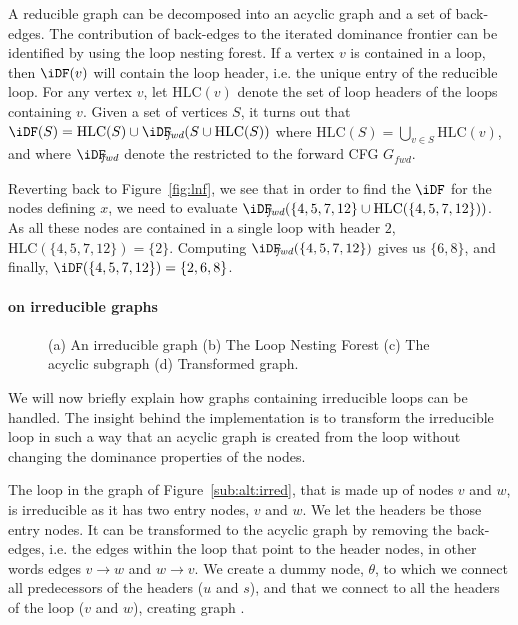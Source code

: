 {{\def\HLC{\mbox{HLC}} A reducible graph can be decomposed into an acyclic graph and a set of back-edges. 
  The contribution of back-edges to the iterated dominance frontier can be identified by using the loop nesting forest. 
  If a vertex $v$ is contained in a loop, then $\iDF(v)$ will contain the loop header, i.e. the unique entry of the reducible loop. 
  For any vertex $v$, let $\HLC(v)$ denote the set of loop headers of the loops containing $v$.
  Given a set of vertices $S$, it turns out that $\iDF(S) = \HLC(S) \cup \iDFfwd(S \cup \HLC(S))$ where $\HLC(S)=\bigcup_{v\in S} \HLC(v)$, and where $\iDFfwd$ denote the \iDF restricted to the forward CFG $G_{\textit{fwd}}$.

  Reverting back to Figure~\ref{fig:lnf}, we see that in order to find the $\iDF$ for the nodes defining $x$, we need to evaluate $\iDFfwd(\{4,5,7,12\} \cup \HLC(\{4,5,7,12\}))$. 
  As all these nodes are contained in a single loop with header $2$, $\HLC(\{4,5,7,12\}) = \{2\}$. 
  Computing $\iDFfwd(\{4,5,7,12\})$ gives us $\{6,8\}$, and finally, $\iDF(\{4,5,7,12\}) = \{2,6,8\}$. 
}

\paragraph{\iDF on irreducible graphs}

\begin{figure}[t]
  \hfill
  \hfill
  \hfill
  \caption{(a) An irreducible graph (b) The Loop Nesting Forest (c) The acyclic 
    subgraph (d) Transformed graph.}
  \label{fig:irred}
\end{figure} 



We will now briefly explain how graphs containing irreducible loops can be handled. 
The insight behind the implementation is to transform the irreducible loop in such a way that an acyclic graph is created from the loop without changing the dominance properties of the nodes.

The loop in the graph of Figure~\ref{sub:alt:irred}, that is made up of nodes 
$v$ and $w$, is irreducible as it has two entry nodes, $v$ and $w$.
We let the headers be those entry nodes.
It can be transformed to the acyclic graph  by 
removing the back-edges, i.e.  the edges within the loop that point to the 
header nodes, in other words edges $v\rightarrow w$ and $w\rightarrow v$.  We 
create a dummy node, $\theta$, to which we connect all predecessors of the 
headers ($u$ and $s$), and that we connect to all the headers of the loop ($v$ 
and $w$), creating graph .

}
